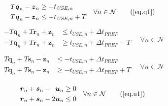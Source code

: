 \begin{equation}
    \begin{split}
        \begin{alignedat}{2}
            T \boldsymbol{q}_{n} - \boldsymbol{z}_{n} &\ge
            - t_{\mathit{USE},n}\\
            T \boldsymbol{q}_{n} - \boldsymbol{z}_{n} &\le
            - t_{\mathit{USE},n} + T\\
        \end{alignedat}
    \end{split}
    \quad \forall n \in \mathcal{N}
    \tag{\ref{eq.q1}}
\end{equation}
\begin{equation}
    \begin{split}
        \begin{alignedat}{2}
            -T \boldsymbol{q}_{n} + T \boldsymbol{r}_{n} + \boldsymbol{z}_{n}
            &\le t_{\mathit{USE},n} + \Delta t_{\mathit{PREP}}\\
            -T \boldsymbol{q}_{n} + T \boldsymbol{r}_{n} + \boldsymbol{z}_{n}
            &\ge t_{\mathit{USE},n} + \Delta t_{\mathit{PREP}} - T\\
            \end{alignedat}
        \quad \forall n \in \mathcal{N}
    \end{split}
    \label{eq.r2}
\end{equation}
\begin{equation}
    \begin{split}
        \begin{alignedat}{2}
            T \boldsymbol{q}_{n} + T \boldsymbol{s}_{n} - \boldsymbol{z}_{n}
            &\le -t_{\mathit{USE},n} + \Delta t_{\mathit{PREP}}\\
            T \boldsymbol{q}_{n} + T \boldsymbol{s}_{n} - \boldsymbol{z}_{n}
            &\ge -t_{\mathit{USE},n} + \Delta t_{\mathit{PREP}} + T\\
            \end{alignedat}
        \quad \forall n \in \mathcal{N}
    \end{split}
    \label{eq.s2}
\end{equation}
\begin{equation}
    \begin{split}
        \begin{alignedat}{8}
            &&\boldsymbol{r}_{n} && {}+{} &&\boldsymbol{s}_{n} && {}-{} 
            &&\boldsymbol{u}_{n} &\ge 0\\
            &&\boldsymbol{r}_{n} && {}+{} &&\boldsymbol{s}_{n} && {}-{} 
            &2&\boldsymbol{u}_{n} &\le 0\\
        \end{alignedat}
        \quad \forall n \in \mathcal{N}
    \end{split}
    \tag{\ref{eq.u1}}
\end{equation}
